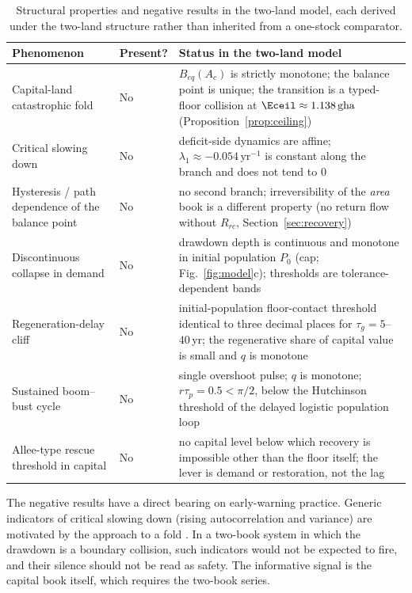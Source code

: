 \begin{table}[!htbp]
\centering\small
\caption{Structural properties and negative results in the two-land model, each derived under the two-land structure rather than inherited from a one-stock comparator.}
\label{tab:neg}
\begin{tabularx}{\textwidth}{>{\raggedright\arraybackslash}p{} l X}
\toprule
Phenomenon & Present? & Status in the two-land model \\
\midrule
Capital-land catastrophic fold & No & $B_{eq}(A_c)$ is strictly monotone; the balance point is unique; the transition is a typed-floor collision at $\Eceil\approx1.138\,\mathrm{gha}$ (Proposition~\ref{prop:ceiling}) \\
Critical slowing down & No & deficit-side dynamics are affine; $\lambda_1\approx-0.054\,\mathrm{yr}^{-1}$ is constant along the branch and does not tend to $0$ \\
Hysteresis / path dependence of the balance point & No & no second branch; irreversibility of the \emph{area} book is a different property (no return flow without $R_{rc}$, Section~\ref{sec:recovery}) \\
Discontinuous collapse in demand & No & drawdown depth is continuous and monotone in initial population $P_0$ (cap; Fig.~\ref{fig:model}c); thresholds are tolerance-dependent bands \\
Regeneration-delay cliff & No & initial-population floor-contact threshold identical to three decimal places for $\tau_g=5$--$40$\,yr; the regenerative share of capital value is small and $q$ is monotone \\
Sustained boom--bust cycle & No & single overshoot pulse; $q$ is monotone; $r\tau_p=0.5<\pi/2$, below the Hutchinson threshold of the delayed logistic population loop \citep{Hutchinson1948} \\
Allee-type rescue threshold in capital & No & no capital level below which recovery is impossible other than the floor itself; the lever is demand or restoration, not the lag \\
\bottomrule
\end{tabularx}
\end{table}

The negative results have a direct bearing on early-warning practice. Generic indicators of critical slowing down (rising autocorrelation and variance) are motivated by the approach to a fold \citep{Scheffer2001}. In a two-book system in which the drawdown is a boundary collision, such indicators would not be expected to fire, and their silence should not be read as safety. The informative signal is the capital book itself, which requires the two-book series.

